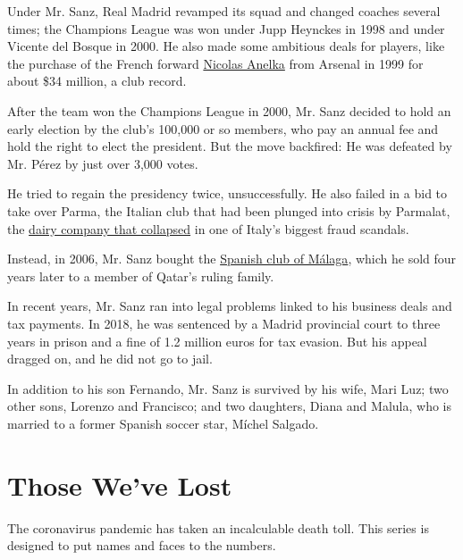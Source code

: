 Under Mr. Sanz, Real Madrid revamped its squad and changed coaches
several times; the Champions League was won under Jupp Heynckes in 1998
and under Vicente del Bosque in 2000. He also made some ambitious deals
for players, like the purchase of the French forward
\href{https://www.nytimes.com/2000/03/16/sports/IHT-anelkas-shadow-casts-gloom-over-real-madrid.html}{Nicolas
Anelka} from Arsenal in 1999 for about \$34 million, a club record.

After the team won the Champions League in 2000, Mr. Sanz decided to
hold an early election by the club's 100,000 or so members, who pay an
annual fee and hold the right to elect the president. But the move
backfired: He was defeated by Mr. Pérez by just over 3,000 votes.

He tried to regain the presidency twice, unsuccessfully. He also failed
in a bid to take over Parma, the Italian club that had been plunged into
crisis by Parmalat, the
\href{https://www.nytimes.com/2004/01/11/business/the-rise-and-fall-of-parma-s-first-family.html}{dairy
company that collapsed} in one of Italy's biggest fraud scandals.

Instead, in 2006, Mr. Sanz bought the
\href{https://www.nytimes.com/2012/10/05/sports/soccer/05iht-malaga05.html}{Spanish
club of Málaga}, which he sold four years later to a member of Qatar's
ruling family.

In recent years, Mr. Sanz ran into legal problems linked to his business
deals and tax payments. In 2018, he was sentenced by a Madrid provincial
court to three years in prison and a fine of 1.2 million euros for tax
evasion. But his appeal dragged on, and he did not go to jail.

In addition to his son Fernando, Mr. Sanz is survived by his wife, Mari
Luz; two other sons, Lorenzo and Francisco; and two daughters, Diana and
Malula, who is married to a former Spanish soccer star, Míchel Salgado.

\href{https://www.nytimes.com/interactive/2020/obituaries/people-died-coronavirus-obituaries.html?action=click\&pgtype=Article\&state=default\&region=BELOW_MAIN_CONTENT\&context=covid_obits_promo}{}

\hypertarget{those-weve-lost}{%
\section{Those We've Lost}\label{those-weve-lost}}

The coronavirus pandemic has taken an incalculable death toll. This
series is designed to put names and faces to the numbers.


